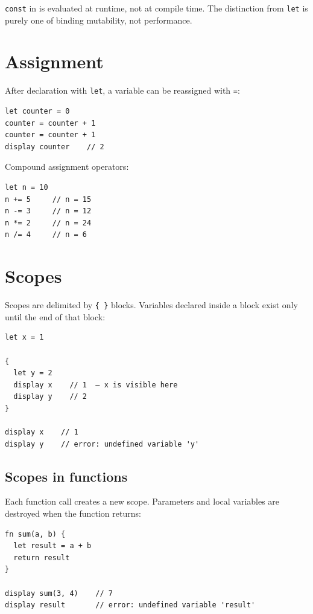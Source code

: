 \begin{nota}
  \lstinline{const} in \hayashi{} is evaluated at runtime, not at compile
  time. The distinction from \lstinline{let} is purely one of binding
  mutability, not performance.
\end{nota}

\section{Assignment}

After declaration with \lstinline{let}, a variable can be reassigned with
\lstinline{=}:

\begin{lstlisting}
let counter = 0
counter = counter + 1
counter = counter + 1
display counter    // 2
\end{lstlisting}

Compound assignment operators:

\begin{lstlisting}
let n = 10
n += 5     // n = 15
n -= 3     // n = 12
n *= 2     // n = 24
n /= 4     // n = 6
\end{lstlisting}

\section{Scopes}

Scopes are delimited by \lstinline|{ }| blocks. Variables declared inside
a block exist only until the end of that block:

\begin{lstlisting}[caption={Variables local to a block}]
let x = 1

{
  let y = 2
  display x    // 1  — x is visible here
  display y    // 2
}

display x    // 1
display y    // error: undefined variable 'y'
\end{lstlisting}

\subsection*{Scopes in functions}

Each function call creates a new scope. Parameters and local variables are
destroyed when the function returns:

\begin{lstlisting}
fn sum(a, b) {
  let result = a + b
  return result
}

display sum(3, 4)    // 7
display result       // error: undefined variable 'result'
\end{lstlisting}

